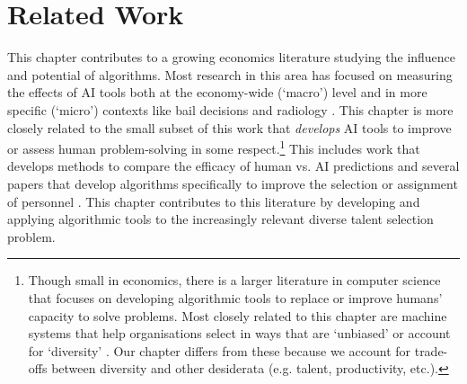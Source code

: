 \section{Related Work}\label{sec:spfrelwork}
This chapter contributes to a growing economics literature studying the influence and potential of algorithms. Most research in this area has focused on measuring the effects of AI tools both at the economy-wide (`macro') level \cite{acemoglu2022automation,babina2024artificial,calvino2023portrait,zolas2021advanced,webb2019impact} and in more specific (`micro') contexts like bail decisions and radiology \cite{albright2023hidden,kleinberg2015prediction,stevenson2019algorithmic,angelova2023algorithmic,imai2023experimental,grimon2022impact,noy2023experimental,brynjolfsson2023generative,bundorf2019humans, mullainathan2019machine, ribers2020machine, agarwal2023combining}. This chapter is more closely related to the small subset of this work that \emph{develops} AI tools to improve or assess human problem-solving in some respect.\footnote{Though small in economics, there is a larger literature in computer science that focuses on developing algorithmic tools to replace or improve humans' capacity to solve problems. Most closely related to this chapter are machine systems that help organisations select in ways that are `unbiased' \cite{tambe2019artificial,raghavan2020mitigating} or account for `diversity' \cite{gillet_diversity_2011,huppenkothen2020entrofy}. Our chapter differs from these because we account for trade-offs between diversity and other desiderata (e.g. talent, productivity, etc.).}  This includes work that develops methods to compare the efficacy of human vs. AI predictions \cite{kleinberg2018human,rambachan2024identifying} and several papers that develop algorithms specifically to improve the selection or assignment of personnel \cite{li2020hiring,bergman2021seven,kleinberg2018algorithmic,huppenkothen2020entrofy}. This chapter contributes to this literature by developing and applying algorithmic tools to the increasingly relevant diverse talent selection problem. 

